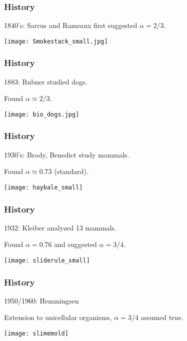 \begin{frame}
  \frametitle{History}

1840's: Sarrus and Rameaux first suggested $\alpha=2/3$.

\begin{center}
  \texttt{[image: Smokestack\_small.jpg]}
\end{center}

\end{frame}

\begin{frame}
  \frametitle{History}

1883: Rubner studied dogs.

Found $\alpha \simeq 2/3$.

\begin{center}
  \texttt{[image: bio\_dogs.jpg]}
\end{center}

\end{frame}

\begin{frame}
  \frametitle{History}

1930's: Brody, Benedict study mammals.

Found $\alpha \simeq 0.73 $ (standard).

\begin{center}
  \texttt{[image: haybale\_small]}
\end{center}

\end{frame}

\begin{frame}
  \frametitle{History}

1932: Kleiber analyzed 13 mammals.

Found $\alpha=0.76$ and suggested $\alpha=3/4$.

\begin{center}
  \texttt{[image: sliderule\_small]}
\end{center}

\end{frame}

\begin{frame}
  \frametitle{History}

  1950/1960: Hemmingsen

  Extension to unicellular organisms, $\alpha=3/4$ assumed true.

\begin{center}
  \texttt{[image: slimemold]}
\end{center}

\end{frame}

